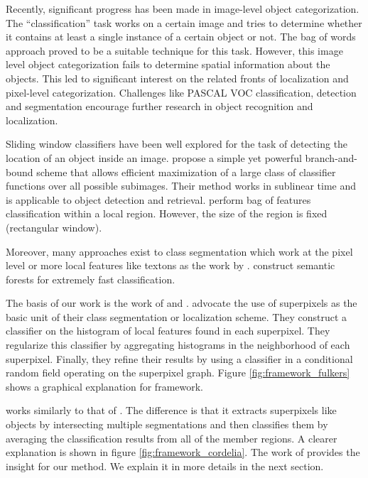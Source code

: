\documentclass[twoside,11pt]{article}
\begin{document}
Recently, significant progress has been made in image-level object
categorization. The ``classification'' task works on a certain image and tries
to determine whether it
contains at least a single instance of a certain object or not. The bag of words
approach proved to be a suitable technique for this task. However, this
image level object categorization fails to determine spatial information about
the objects. This led to significant interest on the related fronts of
localization and pixel-level categorization. Challenges like PASCAL VOC
classification, detection and segmentation encourage further research in
object recognition and localization.

Sliding window classifiers have been well explored for the task of detecting
the location of an object inside an image. \cite{Lampert08beyondsliding} propose
a simple yet powerful branch-and-bound scheme that allows efficient maximization
of a large class of classifier functions over all possible subimages. Their
method works in sublinear time and is applicable to object detection and
retrieval. \cite{1478410} perform bag of features classification within a local region.
However, the size of the region is fixed (rectangular window).

Moreover, many approaches exist to class segmentation which work at the pixel
level or more local features like textons as the work by
\cite{Shotton06textonboost:joint}. \cite{bb32196} construct semantic forests for
extremely fast classification.

The basis of our work is the work of \cite{fulkerson09class} and
\cite{PSH08}. \cite{fulkerson09class} advocate the use of superpixels as the
basic unit of their class segmentation or localization scheme. They construct
a classifier on the histogram of local features found in each superpixel. They
regularize this classifier by aggregating histograms in the neighborhood of each
superpixel. Finally,
they refine their results by using a classifier in a conditional random field
operating on the superpixel graph. Figure \ref{fig:framework_fulkers} shows
a graphical explanation for \cite{fulkerson09class} framework.

\cite{PSH08} works similarly to that of \cite{fulkerson09class}. The difference is
that it extracts superpixels like objects by intersecting multiple segmentations and
then classifies them by averaging the classification results from
all of the member regions. A clearer explanation is shown in figure
\ref{fig:framework_cordelia}. The work of \cite{fulkerson09class} provides the insight
for our method. We explain it in more details in the next section.
\end{document}
